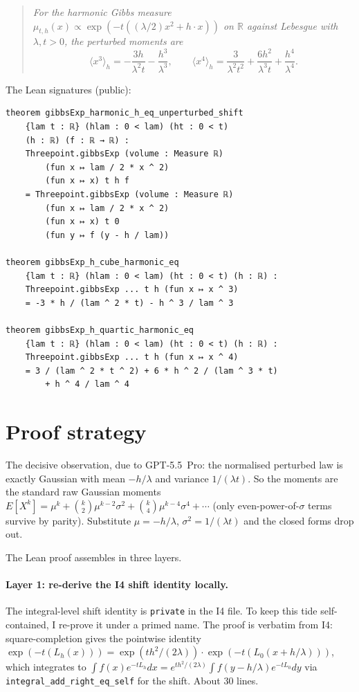 \documentclass[11pt]{article}
\begin{document}
\begin{quote}\itshape
For the harmonic Gibbs measure
$\mu_{t,h}(x) \propto \exp(-t((\lambda/2)x^2 + h\cdot x))$ on
$\mathbb R$ against Lebesgue with $\lambda, t > 0$, the perturbed
moments are
\[
  \langle x^3\rangle_h = -\frac{3h}{\lambda^2 t} - \frac{h^3}{\lambda^3},
  \qquad
  \langle x^4\rangle_h = \frac{3}{\lambda^2 t^2}
    + \frac{6h^2}{\lambda^3 t} + \frac{h^4}{\lambda^4}.
\]
\end{quote}

\noindent The Lean signatures (public):
\begin{verbatim}
theorem gibbsExp_harmonic_h_eq_unperturbed_shift
    {lam t : ℝ} (hlam : 0 < lam) (ht : 0 < t)
    (h : ℝ) (f : ℝ → ℝ) :
    Threepoint.gibbsExp (volume : Measure ℝ)
        (fun x ↦ lam / 2 * x ^ 2)
        (fun x ↦ x) t h f
    = Threepoint.gibbsExp (volume : Measure ℝ)
        (fun x ↦ lam / 2 * x ^ 2)
        (fun x ↦ x) t 0
        (fun y ↦ f (y - h / lam))

theorem gibbsExp_h_cube_harmonic_eq
    {lam t : ℝ} (hlam : 0 < lam) (ht : 0 < t) (h : ℝ) :
    Threepoint.gibbsExp ... t h (fun x ↦ x ^ 3)
    = -3 * h / (lam ^ 2 * t) - h ^ 3 / lam ^ 3

theorem gibbsExp_h_quartic_harmonic_eq
    {lam t : ℝ} (hlam : 0 < lam) (ht : 0 < t) (h : ℝ) :
    Threepoint.gibbsExp ... t h (fun x ↦ x ^ 4)
    = 3 / (lam ^ 2 * t ^ 2) + 6 * h ^ 2 / (lam ^ 3 * t)
        + h ^ 4 / lam ^ 4
\end{verbatim}

\section{Proof strategy}

The decisive observation, due to GPT-5.5~Pro: the normalised
perturbed law is exactly Gaussian with mean $-h/\lambda$ and variance
$1/(\lambda t)$. So the moments are the standard raw Gaussian moments
$E[X^k] = \mu^k + \binom{k}{2}\mu^{k-2}\sigma^2 + \binom{k}{4}
\mu^{k-4}\sigma^4 + \cdots$ (only even-power-of-$\sigma$ terms
survive by parity). Substitute $\mu = -h/\lambda$, $\sigma^2 =
1/(\lambda t)$ and the closed forms drop out.

The Lean proof assembles in three layers.

\paragraph{Layer 1: re-derive the I4 shift identity locally.} The
integral-level shift identity is \texttt{private} in the I4 file. To
keep this tide self-contained, I re-prove it under a primed name. The
proof is verbatim from I4: square-completion gives the pointwise
identity $\exp(-t(L_h(x))) = \exp(t h^2/(2\lambda)) \cdot
\exp(-t(L_0(x + h/\lambda)))$, which integrates to
$\int f(x) e^{-tL_h} dx = e^{th^2/(2\lambda)}\int f(y - h/\lambda)
e^{-tL_0} dy$ via \texttt{integral\_add\_right\_eq\_self} for the
shift. About 30 lines.
\end{document}
